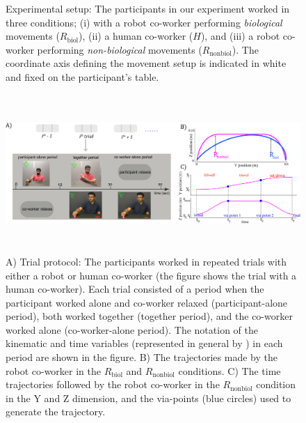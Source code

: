 \begin{figure}[hb]
	\caption{Experimental setup: The participants in our experiment worked in three conditions; (i) with a robot co-worker performing \textit{biological} movements ($\textit{R}_{\text{biol}}$), (ii) a human co-worker ($\textit{H}$), and (iii) a robot co-worker performing \textit{non-biological} movements ($\textit{R}_{\text{nonbiol}}$). The coordinate axis defining the movement setup is indicated in white and fixed on the participant's table.}
	\label{fig:setup}
\end{figure}

\begin{figure}[t]
	\includegraphics[width=\textwidth,height=6cm]{plots/c2-plots/trialprotocol}
	\caption{A) Trial protocol: The participants worked in repeated trials with either a robot or human co-worker (the figure shows the trial with a human co-worker). Each trial consisted of a period when the participant worked alone and co-worker relaxed (participant-alone period), both worked together (together period), and the co-worker worked alone (co-worker-alone period). The notation of the kinematic and time variables (represented in general by \boldmath{$\eta$}) in each period are shown in the figure. B) The trajectories made by the robot co-worker in the $\textit{R}_{\text{biol}}$ and $\textit{R}_{\text{nonbiol}}$ conditions. C) The time trajectories followed by the robot co-worker in the $\textit{R}_{\text{nonbiol}}$ condition in the Y and Z dimension, and the via-points (blue circles) used to generate the trajectory.}
	\label{fig:trial}
\end{figure}


